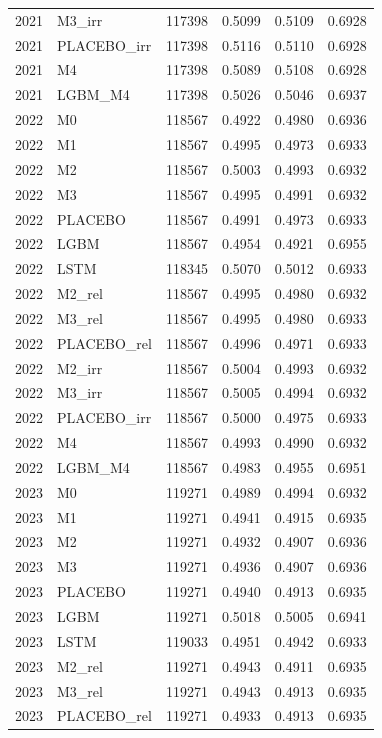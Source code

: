 \begin{tabular}{llrrrr}
2021 & M3\_irr & 117398 & 0.5099 & 0.5109 & 0.6928 \\
2021 & PLACEBO\_irr & 117398 & 0.5116 & 0.5110 & 0.6928 \\
2021 & M4 & 117398 & 0.5089 & 0.5108 & 0.6928 \\
2021 & LGBM\_M4 & 117398 & 0.5026 & 0.5046 & 0.6937 \\
2022 & M0 & 118567 & 0.4922 & 0.4980 & 0.6936 \\
2022 & M1 & 118567 & 0.4995 & 0.4973 & 0.6933 \\
2022 & M2 & 118567 & 0.5003 & 0.4993 & 0.6932 \\
2022 & M3 & 118567 & 0.4995 & 0.4991 & 0.6932 \\
2022 & PLACEBO & 118567 & 0.4991 & 0.4973 & 0.6933 \\
2022 & LGBM & 118567 & 0.4954 & 0.4921 & 0.6955 \\
2022 & LSTM & 118345 & 0.5070 & 0.5012 & 0.6933 \\
2022 & M2\_rel & 118567 & 0.4995 & 0.4980 & 0.6932 \\
2022 & M3\_rel & 118567 & 0.4995 & 0.4980 & 0.6933 \\
2022 & PLACEBO\_rel & 118567 & 0.4996 & 0.4971 & 0.6933 \\
2022 & M2\_irr & 118567 & 0.5004 & 0.4993 & 0.6932 \\
2022 & M3\_irr & 118567 & 0.5005 & 0.4994 & 0.6932 \\
2022 & PLACEBO\_irr & 118567 & 0.5000 & 0.4975 & 0.6933 \\
2022 & M4 & 118567 & 0.4993 & 0.4990 & 0.6932 \\
2022 & LGBM\_M4 & 118567 & 0.4983 & 0.4955 & 0.6951 \\
2023 & M0 & 119271 & 0.4989 & 0.4994 & 0.6932 \\
2023 & M1 & 119271 & 0.4941 & 0.4915 & 0.6935 \\
2023 & M2 & 119271 & 0.4932 & 0.4907 & 0.6936 \\
2023 & M3 & 119271 & 0.4936 & 0.4907 & 0.6936 \\
2023 & PLACEBO & 119271 & 0.4940 & 0.4913 & 0.6935 \\
2023 & LGBM & 119271 & 0.5018 & 0.5005 & 0.6941 \\
2023 & LSTM & 119033 & 0.4951 & 0.4942 & 0.6933 \\
2023 & M2\_rel & 119271 & 0.4943 & 0.4911 & 0.6935 \\
2023 & M3\_rel & 119271 & 0.4943 & 0.4913 & 0.6935 \\
2023 & PLACEBO\_rel & 119271 & 0.4933 & 0.4913 & 0.6935 \\

\end{tabular}
